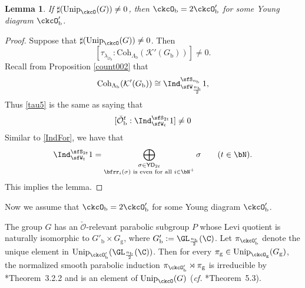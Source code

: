 \documentclass[12pt,a4paper]{amsart}
\newcommand{\trivial}[2][]{\if\relax\detokenize{#1}\relax
  {%
      \color{orange} \vspace{0em} $[$  #2 $]$
      \color{black}
  }
  \else
\ifx#1h
\ifcsname showtrivial\endcsname
{%
    \color{orange} \vspace{0em}  $[$ #2 $]$
    \color{black}
}
\fi
\else {\red Wrong argument!} \fi
\fi
}
\newcommand{\CK}{{\mathcal {K}}}
\newcommand{\CO}{{\mathcal {O}}}
\newcommand{\be}{\begin {equation}}
\newcommand{\ee}{\end {equation}}
\numberwithin{equation}{section}
\newtheorem{lem}[thm]{Lemma}
\theoremstyle{remark}
\def\half{{\tfrac{1}{2}}}
\def\cf{\emph{cf.} }
\def\Unip{\mathrm{Unip}}
\def\YD{\mathsf{YD}}
\def\nbb{n_{\mathrm b}}
\def\Coh{\mathrm{Coh}}
\def\ckcOb{\ckcO_{\mathrm b}}
\def\ckcOpb{\ckcO'_{\mathrm b}}
\def\Gg{G_{\mathrm g}}
\newcommand{\Lam}{{[\lambda]}}
\begin{document}




\begin{lem}\label{thmca0000}
  If  $ \sharp(\Unip_{\ckcO}(G))\neq 0$, then
  $
    \ckcOb= 2\ckcOpb
  $
  for some Young diagram $\ckcOpb$.

\end{lem}
\begin{proof}
Suppose that  $ \sharp(\Unip_{\ckcO}(G))\neq 0$. Then
\be\label{tau5}
   [\tau_{\lambda_{\check \CO_\mathrm b}}: \Coh_{\Lambda_{\mathrm b}}(\CK'(G_\mathrm b))]\neq 0.
\ee
Recall from Proposition \ref{count002} that
  \[
       \Coh_{\Lambda_\mathrm b}(\CK'(G_\mathrm b)) \cong  \Ind_{\sfW_{\frac{n_{\mathrm b}}{2}}}^{\sfS_{n_{\mathrm b}}} 1,
    \]
Thus \eqref{tau5}
 is the same as saying that
\[
 [ {\check \CO_\mathrm b}^t: \Ind_{\sfW_{t}}^{\sfS_{2t}} 1 ]\neq 0
\]
Similar to \eqref{IndFor}, we have that
\begin{equation}\label{IndFor3}
  \Ind_{\sfW_{t}}^{\sfS_{2t}} 1= \bigoplus_{\substack{\sigma\in \YD_{2t}\\
      \bfrr_{i}(\sigma) \text{ is even for all }i\in \bN^+}} \sigma\qquad (t\in \bN).
\end{equation}
This implies the lemma.
\end{proof}

Now we assume that $
    \ckcOb= 2\ckcOpb
  $
  for some Young diagram $\ckcOpb$.

The group $G$ has an $\check \CO$-relevant parabolic subgroup $P$ whose Levi quotient  is naturally isomorphic to $G'_{\mathrm b}\times G_{\mathrm g}$, where
$G'_{\mathrm b}:=\GL_{\frac{n_{\mathrm b}}{2}}(\C)$. Let $\pi_{\ckcOpb}$ denote the
unique element in $\Unip_{\ckcOpb}(\GL_{\frac{n_{\mathrm b}}{2}}(\C))$. Then for
every $\pi_\mathrm g\in \Unip_{\ckcO_{\mathrm g}}(\Gg)$, the normalized smooth parabolic
induction $\pi_{\ckcOpb}\rtimes \pi_{\mathrm g}$ is irreducible by
\cite{Mat96}*{Theorem~3.2.2} and is an element of $\Unip_{\ckcO}(G)$ (\cf
\cite{MR.U}*{Theorem~5.3}).
\end{document}
